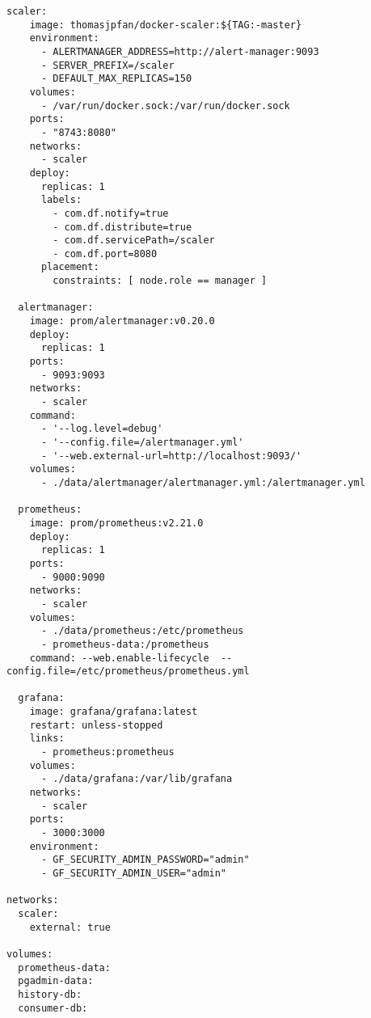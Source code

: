\begin{lstlisting}[style=bashStyle,caption={Docker Compose},label=lst:dockerCompose]
  scaler:
    image: thomasjpfan/docker-scaler:${TAG:-master}
    environment:
      - ALERTMANAGER_ADDRESS=http://alert-manager:9093
      - SERVER_PREFIX=/scaler
      - DEFAULT_MAX_REPLICAS=150
    volumes:
      - /var/run/docker.sock:/var/run/docker.sock
    ports:
      - "8743:8080"
    networks:
      - scaler
    deploy:
      replicas: 1
      labels:
        - com.df.notify=true
        - com.df.distribute=true
        - com.df.servicePath=/scaler
        - com.df.port=8080
      placement:
        constraints: [ node.role == manager ]

  alertmanager:
    image: prom/alertmanager:v0.20.0
    deploy:
      replicas: 1
    ports:
      - 9093:9093
    networks:
      - scaler
    command:
      - '--log.level=debug'
      - '--config.file=/alertmanager.yml'
      - '--web.external-url=http://localhost:9093/'
    volumes:
      - ./data/alertmanager/alertmanager.yml:/alertmanager.yml

  prometheus:
    image: prom/prometheus:v2.21.0
    deploy:
      replicas: 1
    ports:
      - 9000:9090
    networks:
      - scaler
    volumes:
      - ./data/prometheus:/etc/prometheus
      - prometheus-data:/prometheus
    command: --web.enable-lifecycle  --config.file=/etc/prometheus/prometheus.yml

  grafana:
    image: grafana/grafana:latest
    restart: unless-stopped
    links:
      - prometheus:prometheus
    volumes:
      - ./data/grafana:/var/lib/grafana
    networks:
      - scaler
    ports:
      - 3000:3000
    environment:
      - GF_SECURITY_ADMIN_PASSWORD="admin"
      - GF_SECURITY_ADMIN_USER="admin"

networks:
  scaler:
    external: true

volumes:
  prometheus-data:
  pgadmin-data:
  history-db:
  consumer-db:

\end{lstlisting}



